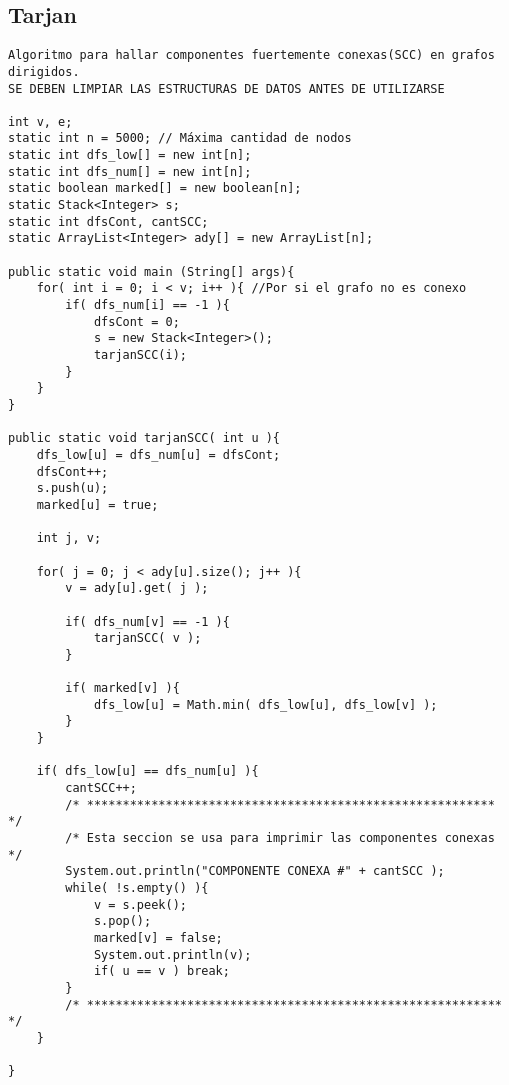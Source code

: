 \documentclass[10pt,letterpaper,twocolumn,twosided]{article}
\begin{document}
\subsection{Tarjan}
\begin{lstlisting}
Algoritmo para hallar componentes fuertemente conexas(SCC) en grafos dirigidos.
SE DEBEN LIMPIAR LAS ESTRUCTURAS DE DATOS ANTES DE UTILIZARSE

int v, e; 
static int n = 5000; // Máxima cantidad de nodos
static int dfs_low[] = new int[n];
static int dfs_num[] = new int[n];
static boolean marked[] = new boolean[n];
static Stack<Integer> s;
static int dfsCont, cantSCC;
static ArrayList<Integer> ady[] = new ArrayList[n];
	
public static void main (String[] args){
    for( int i = 0; i < v; i++ ){ //Por si el grafo no es conexo
        if( dfs_num[i] == -1 ){
            dfsCont = 0;
            s = new Stack<Integer>();
            tarjanSCC(i);
        }
    }
}
	
public static void tarjanSCC( int u ){
	dfs_low[u] = dfs_num[u] = dfsCont;
	dfsCont++;
	s.push(u);
	marked[u] = true;
		
	int j, v;
		
	for( j = 0; j < ady[u].size(); j++ ){
		v = ady[u].get( j );
			
		if( dfs_num[v] == -1 ){
			tarjanSCC( v );
		}
			
		if( marked[v] ){
			dfs_low[u] = Math.min( dfs_low[u], dfs_low[v] );
		}
	}
		
	if( dfs_low[u] == dfs_num[u] ){
		cantSCC++;
        /* ********************************************************* */
        /* Esta seccion se usa para imprimir las componentes conexas */
		System.out.println("COMPONENTE CONEXA #" + cantSCC );
		while( !s.empty() ){
			v = s.peek();
			s.pop();
			marked[v] = false;
			System.out.println(v);
			if( u == v ) break;
		}
        /* ********************************************************** */
	}
		
}


\end{lstlisting}
\end{document}

